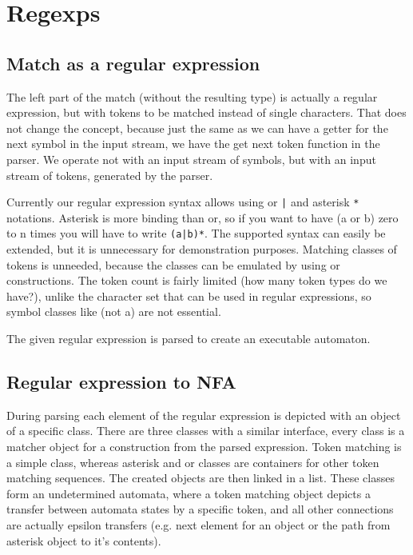 \section{\label{sec:regexps}Regexps}

\subsection{Match as a regular expression}
The left part of the match (without the resulting type) is actually a
regular expression, but with tokens to be matched instead of single
characters. That does not change the concept, because just the same as
we can have a getter for the next symbol in the input stream, we have
the get next token function in the parser. We operate not with an input
stream of symbols, but with an input stream of tokens, generated by the
parser.

Currently our regular expression syntax allows using or \verb/|/ and
asterisk \verb|*| notations. Asterisk is more binding than or, so if you
want to have (a or b) zero to n times you will have to write
\verb/(a|b)*/. The supported syntax can easily be extended, but it is
unnecessary for demonstration purposes. Matching classes of tokens is
unneeded, because the classes can be emulated by using or constructions.
The token count is fairly limited (how many token types do we have?),
unlike the character set that can be used in regular expressions, so
symbol classes like (not a) are not essential. 

The given regular expression is parsed to create an executable
automaton. 

\subsection{Regular expression to NFA}
During parsing each element of the regular expression is depicted with
an object of a specific class. There are three classes with a similar
interface, every class is a matcher object for a construction from the
parsed expression. Token matching is a simple class, whereas asterisk
and or classes are containers for other token matching sequences. The
created objects are then linked in a list. These classes form an
undetermined automata, where a token matching object depicts a transfer
between automata states by a specific token, and all other connections
are actually epsilon transfers (e.g. next element for an object or the
path from asterisk object to it's contents).


